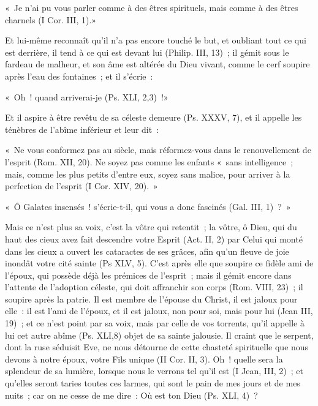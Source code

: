 \documentclass[french,twoside]{book} %
\newenvironment{quoteblock}%
  {\begin{quoting}}
  {\end{quoting}}
\newenvironment{quotebar}{%
    \def\FrameCommand{{\color{rubric!10!}\vrule width 0.5em} \hspace{0.9em}}%
    \def\OuterFrameSep{\itemsep} %
    \MakeFramed {\advance\hsize-\width \FrameRestore}
  }%
  {%
    \endMakeFramed
  }
\renewenvironment{quoteblock}%
  {%
    \savenotes
    \setstretch{0.9}
    \normalfont
    \begin{quotebar}
  }
  {%
    \end{quotebar}
    \spewnotes
  }
\begin{document}
\begin{quoteblock}
\noindent « Je n’ai pu vous parler comme à des êtres spirituels, mais comme à des êtres charnels (I Cor. III, 1).»\end{quoteblock}

\noindent Et lui-même reconnaît qu’il n’a pas encore touché le but, et oubliant tout ce qui est derrière, il tend à ce qui est devant lui (Philip. III, 13) ; il gémit sous le fardeau de malheur, et son âme est altérée du Dieu vivant, comme le cerf soupire après l’eau des fontaines ; et il s’écrie :\par

\begin{quoteblock}
\noindent « Oh ! quand arriverai-je (Ps. XLI, 2,3) !»\end{quoteblock}

\noindent Et il aspire à être revêtu de sa céleste demeure (Ps. XXXV, 7), et il appelle les ténèbres de l’abîme inférieur et leur dit :\par

\begin{quoteblock}
\noindent « Ne vous conformez pas au siècle, mais réformez-vous dans le renouvellement de l’esprit (Rom. XII, 20). Ne soyez pas comme les enfants « sans intelligence ; mais, comme les plus petits d’entre eux, soyez sans malice, pour arriver à la perfection de l’esprit (I Cor. XIV, 20). »\end{quoteblock}


\begin{quoteblock}
\noindent « Ô Galates insensés ! s’écrie-t-il, qui vous a donc fascinés (Gal. III, 1) ? »\end{quoteblock}

\noindent Mais ce n’est plus sa voix, c’est la vôtre qui retentit ; la vôtre, ô Dieu, qui du haut des cieux avez fait descendre votre Esprit (Act. II, 2) par Celui qui monté dans les cieux a ouvert les cataractes de ses grâces, afin qu’un fleuve de joie inondât votre cité sainte (Ps XLV, 5). C’est après elle que soupire ce fidèle ami de l’époux, qui possède déjà les prémices de l’esprit ; mais il gémit encore dans l’attente de l’adoption céleste, qui doit affranchir son corps (Rom. VIII, 23) ; il soupire après la patrie. Il est membre de l’épouse du Christ, il est jaloux pour elle : il est l’ami de l’époux, et il est jaloux, non pour soi, mais pour lui (Jean III, 19) ; et ce n’est point par sa voix, mais par celle de vos torrents, qu’il appelle à lui cet autre abîme (Ps. XLI,8) objet de sa sainte jalousie. Il craint que le serpent, dont la ruse séduisit Eve, ne nous détourne de cette chasteté spirituelle que nous devons à notre époux, votre Fils unique (II Cor. II, 3). Oh ! quelle sera la splendeur de sa lumière, lorsque nous le verrons tel qu’il est (I Jean, III, 2) ; et qu’elles seront taries toutes ces larmes, qui sont le pain de mes jours et de mes nuits ; car on ne cesse de me dire : Où est ton Dieu (Ps. XLI, 4) ?
\end{document}

